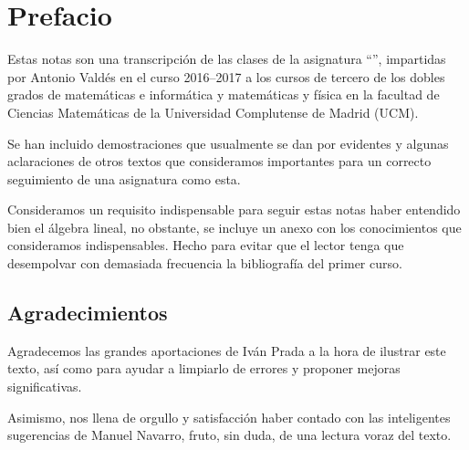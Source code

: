 \section*{Prefacio}
Estas notas son una transcripción de las clases de la asignatura ``'', impartidas por Antonio Valdés en el curso 2016--2017 a los cursos de tercero de los dobles grados de matemáticas e informática y matemáticas y física en la facultad de Ciencias Matemáticas de la Universidad Complutense de Madrid (UCM).

Se han incluido demostraciones que usualmente se dan por evidentes y algunas aclaraciones de otros textos que consideramos importantes para un correcto seguimiento de una asignatura como esta.

Consideramos un requisito indispensable para seguir estas notas haber entendido bien el álgebra lineal, no obstante, se incluye un anexo con los conocimientos que consideramos indispensables. Hecho para evitar que el lector tenga que desempolvar con demasiada frecuencia la bibliografía del primer curso.
\subsection*{Agradecimientos}
Agradecemos las grandes aportaciones de Iván Prada a la hora de ilustrar este texto, así como para ayudar a limpiarlo de errores y proponer mejoras significativas.

Asimismo, nos llena de orgullo y satisfacción haber contado con las inteligentes sugerencias de Manuel Navarro, fruto, sin duda, de una lectura voraz del texto.